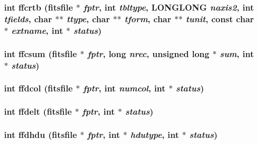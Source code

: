 \subsubsection{\setlength{\rightskip}{0pt plus 5cm}int ffcrtb (\bf{fitsfile} $\ast$ {\em fptr}, int {\em tbltype}, \bf{LONGLONG} {\em naxis2}, int {\em tfields}, char $\ast$$\ast$ {\em ttype}, char $\ast$$\ast$ {\em tform}, char $\ast$$\ast$ {\em tunit}, const char $\ast$ {\em extname}, int $\ast$ {\em status})}\label{src_2fitsio_8h_9e0996d3514ac3a9395ffe53f47ae47c}


\subsubsection{\setlength{\rightskip}{0pt plus 5cm}int ffcsum (\bf{fitsfile} $\ast$ {\em fptr}, long {\em nrec}, unsigned long $\ast$ {\em sum}, int $\ast$ {\em status})}\label{src_2fitsio_8h_ed833bcd8507fea7a754cf607a386837}


\subsubsection{\setlength{\rightskip}{0pt plus 5cm}int ffdcol (\bf{fitsfile} $\ast$ {\em fptr}, int {\em numcol}, int $\ast$ {\em status})}\label{src_2fitsio_8h_1ff2796da87658614b59e50b787208ad}


\subsubsection{\setlength{\rightskip}{0pt plus 5cm}int ffdelt (\bf{fitsfile} $\ast$ {\em fptr}, int $\ast$ {\em status})}\label{src_2fitsio_8h_02d32917d27a457a77ac003c7c6295dd}


\subsubsection{\setlength{\rightskip}{0pt plus 5cm}int ffdhdu (\bf{fitsfile} $\ast$ {\em fptr}, int $\ast$ {\em hdutype}, int $\ast$ {\em status})}\label{src_2fitsio_8h_8805c9b8c1cc419ceb3e0f9e6779e6c4}


